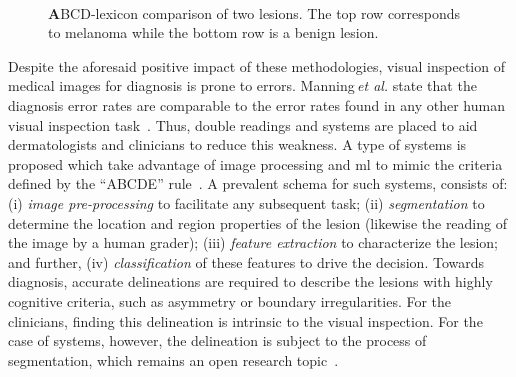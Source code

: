 \begin{figure}
\begin{center}
    \hfill
    \hfill
    \hfill
  \hspace*{\fill}\\
    \caption{{\textbf ABCD}-lexicon comparison of two lesions. The top row corresponds to melanoma while the bottom row is a benign lesion.}
  \label{fig:lexicon}
\end{center}
\end{figure}
%

Despite the aforesaid positive impact of these methodologies, visual inspection of medical images for diagnosis is prone to errors.
Manning\,\emph{et al.} state that the diagnosis error rates are comparable to the error rates found in any other human visual inspection task~\cite{manning2014perception}.
Thus, double readings and \cad systems are placed to aid dermatologists and clinicians to reduce this weakness.
A type of \cad systems is proposed which take advantage of image processing and \ac{ml} to mimic the criteria defined by the ``ABCDE'' rule~\cite{rastgoo2015automatic}.
A prevalent schema for such \cad systems, consists of: (i) \textit{image pre-processing} to facilitate any subsequent task; (ii) \textit{segmentation} to determine the location and region properties of the lesion (likewise the reading of the image by a human grader); (iii) \textit{feature extraction} to characterize the lesion; and further, (iv) \textit{classification} of these features to drive the decision.
Towards diagnosis, accurate delineations are required to describe the lesions with highly cognitive criteria, such as asymmetry or boundary irregularities.
For the clinicians, finding this delineation is intrinsic to the visual inspection. 
For the case of \cad systems, however, the delineation is subject to the process of segmentation, which remains an open research topic~\cite{duncan2000medical}.

